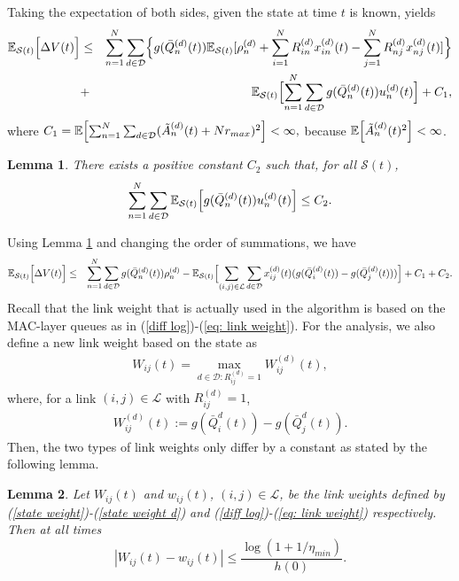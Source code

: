 \documentclass[10pt,onecolumn,draftclsnofoot,journal]{IEEEtran}
\newtheorem{lemma}{Lemma}
\newcommand{\mD} {\mathcal{D}}
\newcommand{\mS}{\mathcal{S}}
\newcommand{\be}{\begin{eqnarray}}
\newcommand{\ee}{\end{eqnarray}}
\newcommand{\ben}{\begin{eqnarray*}}
\newcommand{\een}{\end{eqnarray*}}
\newcommand{\expect}[1]{{\mathbb E} \Bigl[ #1\Bigr]}
\newcommand{\expectS}[1]{{\mathbb E_{\mathcal{S}(t)}} \Bigl[ #1\Bigr]}
\begin{document}
Taking the expectation of both sides, given the state at time $t$ is known, yields
\ben
\expectS{\Delta V(t)} &\leq& \sum_{n=1}^N\sum_{d \in \mD}\Bigl\{g(\bar{Q}_n^{(d)}(t))\mathbb{E}_{\mS(t)}[\rho_n^{(d)} +\sum_{i=1}^NR^{(d)}_{in} x_{in}^{(d)}(t)-\sum_{j=1}^NR^{(d)}_{nj} x_{nj}^{(d)}(t)] \Bigr\}\\
& + & \expectS{\sum_{n=1}^N\sum_{d \in \mD}g(\bar{Q}_n^{(d)}(t))u_n^{(d)}(t)}+C_1,
\een
where
$
C_1= \expect{\sum_{n=1}^N\sum_{d \in \mD}(\tilde{A}_n^{(d)}(t)+N r_{max})^2} < \infty,
$
because $\expect{\tilde{A}_n^{(d)}(t)^2}<  \infty$.
\begin{lemma}
\label{lemma:bound_third_term_geo}
There exists a positive constant $C_2$ such that, for all $\mS(t)$,
$$\sum_{n=1}^N\sum_{d \in \mD} \expectS{g(\bar{Q}_n^{(d)}(t))u_n^{(d)}(t)}\le C_2.$$
\end{lemma}
Using Lemma \ref{lemma:bound_third_term_geo} and changing the order of summations, we have
\ben \label{eq: drift1}
\expectS{\Delta V(t)} &\leq&  \sum_{n=1}^N\sum_{d \in \mD}g(\bar{Q}_n^{(d)}(t))\rho_n^{(d)} - \expectS{\sum_{(i,j) \in \mathcal{L}}\sum_{d \in \mD} x_{ij}^{(d)}(t)(g(\bar{Q}_i^{(d)}(t))-g(\bar{Q}_j^{(d)}(t)))}+C_1+C_2.
\een
Recall that the link weight that is actually used in the algorithm is based on the MAC-layer queues as in (\ref{diff log})-(\ref{eq: link weight}).
For the analysis, we also define a new link weight based on the state as
\be \label{state weight}
W_{ij}(t)=\max_{d \in \mD: R^{(d)}_{ij}=1} W_{ij}^{(d)}(t),
 \ee
where, for a link $(i,j) \in \mathcal{L}$ with $ R^{(d)}_{ij}=1$,
 \be \label{state weight d}
 W_{ij}^{(d)}(t):=g(\bar{Q}_i^{d}(t))- g(\bar{Q}_j^{d}(t)).
 \ee
Then, the two types of link weights only differ by a constant as stated by the following lemma.
\begin{lemma} \label{lemma}
Let $W_{ij}(t)$ and $w_{ij}(t)$, $(i,j) \in \mathcal{L}$, be the link weights defined by (\ref{state weight})-(\ref{state weight d}) and (\ref{diff log})-(\ref{eq: link weight}) respectively. Then at all times
$$|W_{ij}(t)-w_{ij}(t)| \leq \frac{\log(1+1/\eta_{min})}{h(0)}.$$
\end{lemma}
\end{document}
